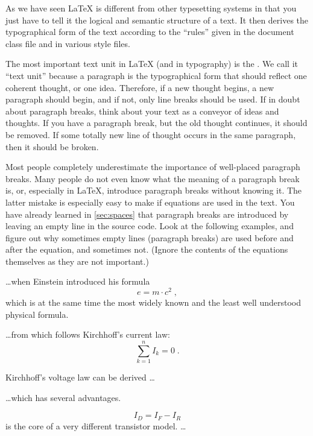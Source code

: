 As we have seen \LaTeX{} is different from other typesetting systems in that
you just have to tell it the logical and semantic structure of a text.  It then
derives the typographical form of the text according to the \enquote{rules}
given in the document class file and in various style files.

The most important text unit in \LaTeX{} (and in typography) is the
.  We call it \enquote{text unit} because a paragraph is the
typographical form that should reflect one coherent thought, or one idea.
Therefore, if a new thought begins, a new paragraph should begin, and if not,
only line breaks should be used.  If in doubt about paragraph breaks, think
about your text as a conveyor of ideas and thoughts.  If you have a paragraph
break, but the old thought continues, it should be removed.  If some totally
new line of thought occurs in the same paragraph, then it should be broken.

Most people completely underestimate the importance of well-placed paragraph
breaks. Many people do not even know what the meaning of a paragraph break is,
or, especially in \LaTeX, introduce paragraph breaks without knowing it.  The
latter mistake is especially easy to make if equations are used in the text.
You have already learned in \autoref{sec:spaces} that paragraph breaks are
introduced by leaving an empty line in the source code. Look at the following
examples, and figure out why sometimes empty lines (paragraph breaks) are used
before and after the equation, and sometimes not. (Ignore the contents of the
equations themselves as they are not important.)

\begin{example}[standalone, paperwidth=5cm, paperheight=4cm]
\ldots when Einstein introduced
his formula
\begin{equation}
  e = m \cdot c^2 \; ,
\end{equation}
which is at the same time the
most widely known and the least
well understood physical formula.
\end{example}
\begin{example}[standalone, paperwidth=5cm, paperheight=4cm]
\ldots from which follows
Kirchhoff's current law:
\begin{equation}
  \sum_{k=1}^{n} I_k = 0 \; .
\end{equation}

Kirchhoff's voltage law can
be derived \ldots
\end{example}
\begin{example}[standalone, paperwidth=5cm, paperheight=4cm]
\ldots which has several
advantages.

\begin{equation}
  I_D = I_F - I_R
\end{equation}
is the core of a very different
transistor model. \ldots
\end{example}

